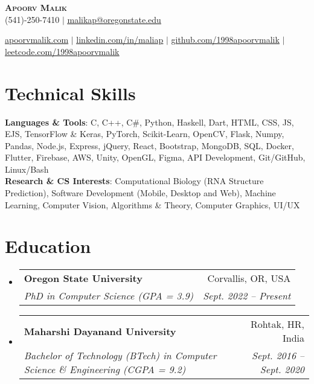 \documentclass[letterpaper,11pt]{article}
\makeatletter
\newcommand{\resumeSubheading}[4]{
  \vspace{-2pt}\item
    \begin{tabular*}{0.97\textwidth}[t]{l@{\extracolsep{\fill}}r}
      \textbf{#1} & #2 \\
      \textit{\small#3} & \textit{\small #4} \\
    \end{tabular*}\vspace{-7pt}
}
\newcommand{\resumeSubHeadingListStart}{\begin{itemize}[leftmargin=0.15in, label={}]}
\newcommand{\resumeSubHeadingListEnd}{\end{itemize}}
\makeatother
\begin{document}



\begin{center}
    \textbf{\Huge \scshape Apoorv Malik} \\ \vspace{5pt}
    (541)-250-7410 $|$ \href{mailto:malikap@oregonstate.edu}{\underline{malikap@oregonstate.edu}}
\end{center}

\begin{center} 
    \href{http://apoorvmalik.com}{\underline{apoorvmalik.com}} $|$
    \href{https://linkedin.com/in/maliap}{\underline{linkedin.com/in/maliap}} $|$
    \href{https://github.com/1998apoorvmalik}{\underline{github.com/1998apoorvmalik}} $|$
    \href{https://leetcode.com/1998apoorvmalik}{\underline{leetcode.com/1998apoorvmalik}}
\end{center}


\section{Technical Skills}
 \begin{itemize}[leftmargin=0.15in, label={}]
    \small{\item{
     \textbf{Languages \& Tools}{: C, C++, C\#, Python, Haskell, Dart, HTML, CSS, JS, EJS, TensorFlow \& Keras, PyTorch, Scikit-Learn, OpenCV, Flask, Numpy, Pandas, Node.js, Express, jQuery, React, Bootstrap, MongoDB, SQL, Docker, Flutter, Firebase, AWS, Unity, OpenGL, Figma, API Development, Git/GitHub, Linux/Bash } \\

     \textbf{Research \& CS Interests}{: Computational Biology (RNA Structure Prediction), Software Development (Mobile, Desktop and Web), Machine Learning, Computer Vision, Algorithms \& Theory, Computer Graphics, UI/UX }
    }}
 \end{itemize}

\section{Education}
  \resumeSubHeadingListStart
    \resumeSubheading
      {Oregon State University}{Corvallis, OR, USA}
      {PhD in Computer Science (GPA = 3.9)}{Sept. 2022 – Present}
    \resumeSubheading
      {Maharshi Dayanand University}{Rohtak, HR, India}
      {Bachelor of Technology (BTech) in Computer Science \& Engineering (CGPA = 9.2)}{Sept. 2016 – Sept. 2020}
  \resumeSubHeadingListEnd
\end{document}
